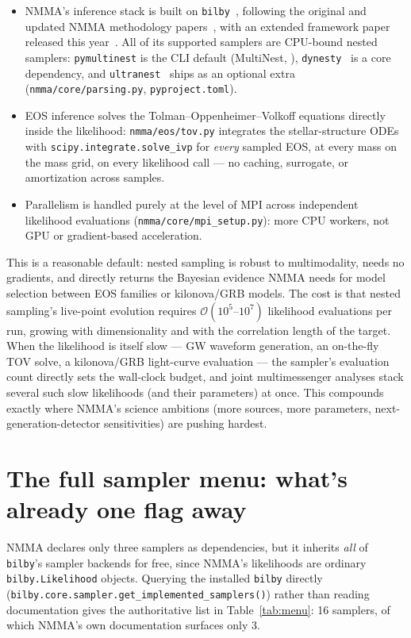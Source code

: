 \documentclass[11pt]{article}
\newcommand{\code}[1]{\texttt{#1}}
\begin{document}
\begin{itemize}
\item NMMA's inference stack is built on \code{bilby}~\cite{Ashton:2018jfp}, following the
original and updated NMMA methodology papers~\cite{Coughlin:2018fis,Pang:2022rzc}, with an
extended framework paper released this year~\cite{Rose:2026cnm}. All of its supported
samplers are CPU-bound nested samplers: \code{pymultinest} is the CLI default (MultiNest,
\cite{Feroz:2008xx}), \code{dynesty}~\cite{Speagle:2019ivv} is a core dependency, and
\code{ultranest}~\cite{Buchner:2021cql} ships as an optional extra
(\code{nmma/core/parsing.py}, \code{pyproject.toml}).
\item EOS inference solves the Tolman--Oppenheimer--Volkoff equations directly inside the
likelihood: \code{nmma/eos/tov.py} integrates the stellar-structure ODEs with
\code{scipy.integrate.solve\_ivp} for \emph{every} sampled EOS, at every mass on the mass
grid, on every likelihood call --- no caching, surrogate, or amortization across samples.
\item Parallelism is handled purely at the level of MPI across independent likelihood
evaluations (\code{nmma/core/mpi\_setup.py}): more CPU workers, not GPU or
gradient-based acceleration.
\end{itemize}

This is a reasonable default: nested sampling is robust to multimodality, needs no
gradients, and directly returns the Bayesian evidence NMMA needs for model selection between
EOS families or kilonova/GRB models. The cost is that nested sampling's live-point evolution
requires $\mathcal{O}(10^5\text{--}10^7)$ likelihood evaluations per run, growing with
dimensionality and with the correlation length of the target. When the likelihood is itself
slow --- GW waveform generation, an on-the-fly TOV solve, a kilonova/GRB light-curve
evaluation --- the sampler's evaluation count directly sets the wall-clock budget, and joint
multimessenger analyses stack several such slow likelihoods (and their parameters) at once.
This compounds exactly where NMMA's science ambitions (more sources, more parameters,
next-generation-detector sensitivities) are pushing hardest.

\section{The full sampler menu: what's already one flag away}
\label{sec:menu}

NMMA declares only three samplers as dependencies, but it inherits \emph{all} of
\code{bilby}'s sampler backends for free, since NMMA's likelihoods are ordinary
\code{bilby.Likelihood} objects. Querying the installed \code{bilby} directly
(\code{bilby.core.sampler.get\_implemented\_samplers()}) rather than reading documentation
gives the authoritative list in Table~\ref{tab:menu}: 16 samplers, of which NMMA's own
documentation surfaces only 3.
\end{document}
